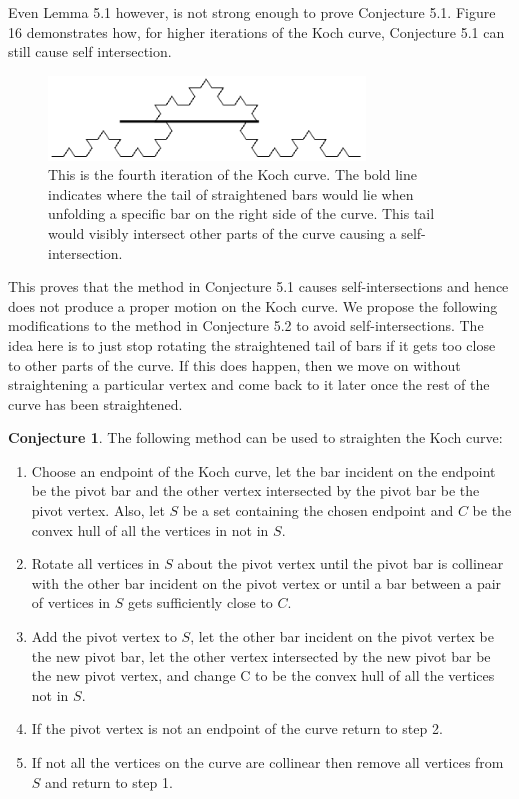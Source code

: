 \documentclass{article}
\theoremstyle{definition}
\newtheorem{conjecture}{Conjecture}[section]
\begin{document}
Even Lemma 5.1 however, is not strong enough to prove Conjecture 5.1. Figure 16 demonstrates how, for higher iterations of the Koch curve, Conjecture 5.1 can still cause self intersection.
\begin{figure}[H]
    \centering
    \includegraphics[width=0.75\textwidth]{KochMethodCounterexample.png}
    \caption{This is the fourth iteration of the Koch curve. The bold line indicates where the tail of straightened bars would lie when unfolding a specific bar on the right side of the curve. This tail would visibly intersect other parts of the curve causing a self-intersection.}
\end{figure}
\noindent This proves that the method in Conjecture 5.1 causes self-intersections and hence does not produce a proper motion on the Koch curve. We propose the following modifications to the method in Conjecture 5.2 to avoid self-intersections. The idea here is to just stop rotating the straightened tail of bars if it gets too close to other parts of the curve. If this does happen, then we move on without straightening a particular vertex and come back to it later once the rest of the curve has been straightened.
\begin{conjecture}
    The following method can be used to straighten the Koch curve:
    \begin{enumerate}
        \item Choose an endpoint of the Koch curve, let the bar incident on the endpoint be the pivot bar and the other vertex intersected by the pivot bar be the pivot vertex. Also, let $S$ be a set containing the chosen endpoint and $C$ be the convex hull of all the vertices in not in $S$.
        \item Rotate all vertices in $S$ about the pivot vertex until the pivot bar is collinear with the other bar incident on the pivot vertex or until a bar between a pair of vertices in $S$ gets sufficiently close to $C$.
        \item Add the pivot vertex to $S$, let the other bar incident on the pivot vertex be the new pivot bar, let the other vertex intersected by the new pivot bar be the new pivot vertex, and change C to be the convex hull of all the vertices not in $S$.
        \item If the pivot vertex is not an endpoint of the curve return to step 2.
        \item If not all the vertices on the curve are collinear then remove all vertices from $S$ and return to step 1.
    \end{enumerate}
\end{conjecture}
\end{document}
